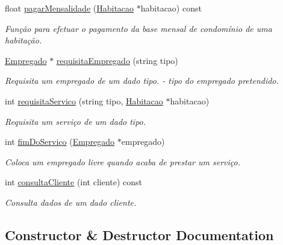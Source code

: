 \begin{DoxyCompactItemize}
float \hyperlink{class_condominio_a16747ea7d4e1b442b1985725f5a9aeab}{pagar\+Mensalidade} (\hyperlink{class_habitacao}{Habitacao} $\ast$habitacao) const 
\begin{DoxyCompactList}\small\item\em Função para efetuar o pagamento da base mensal de condomínio de uma habitação. \end{DoxyCompactList}\item 
\hyperlink{class_empregado}{Empregado} $\ast$ \hyperlink{class_condominio_a5eec0c5c3a1cb566332431939bcbcb56}{requisita\+Empregado} (string tipo)
\begin{DoxyCompactList}\small\item\em Requisita um empregado de um dado tipo.  -\/ tipo do empregado pretendido. \end{DoxyCompactList}\item 
int \hyperlink{class_condominio_adb5c91a9114dbc1c0f3c8c3e9f835152}{requisita\+Servico} (string tipo, \hyperlink{class_habitacao}{Habitacao} $\ast$habitacao)
\begin{DoxyCompactList}\small\item\em Requisita um serviço de um dado tipo. \end{DoxyCompactList}\item 
int \hyperlink{class_condominio_af2c2cdd83d43ea6641542efe01ff94b9}{fim\+Do\+Servico} (\hyperlink{class_empregado}{Empregado} $\ast$empregado)
\begin{DoxyCompactList}\small\item\em Coloca um empregado livre quando acaba de prestar um serviço. \end{DoxyCompactList}\item 
int \hyperlink{class_condominio_abfbd356bc26fde54dc40de2f9174f430}{consulta\+Cliente} (int cliente) const 
\begin{DoxyCompactList}\small\item\em Consulta dados de um dado cliente. \end{DoxyCompactList}\end{DoxyCompactItemize}


\subsection{Constructor \& Destructor Documentation}
